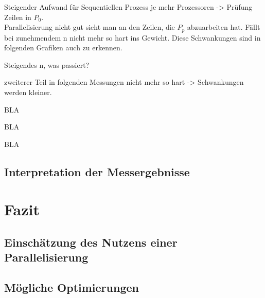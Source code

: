 \documentclass[
10pt, %
a4paper, %
oneside, %
headinclude,footinclude, %
BCOR5mm, %
]{scrartcl}
\begin{document}
 Steigender Aufwand für Sequentiellen Prozess je mehr Prozessoren -> Prüfung Zeilen in \(P_{0}\).\\
 Parallelisierung nicht gut sieht man an den Zeilen, die \(P_{p}\) abzuarbeiten hat. Fällt bei zunehmendem n nicht mehr so hart ins Gewicht. Diese Schwankungen sind in folgenden Grafiken auch zu erkennen.
 
 Steigendes n, was passiert?
 
 
 
 
 
 zweiterer Teil in folgenden Messungen nicht mehr so hart -> Schwankungen werden kleiner.

BLA

BLA

BLA



\subsection{Interpretation der Messergebnisse}



\section{Fazit}


\subsection{Einschätzung des Nutzens einer Parallelisierung}


\subsection{Mögliche Optimierungen}
\end{document}
